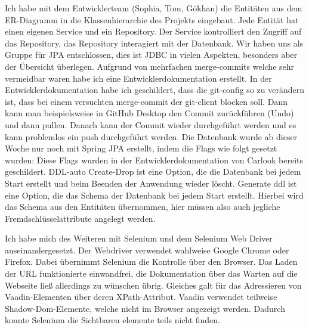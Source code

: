 Ich habe mit dem Entwicklerteam (Sophia, Tom, Gökhan) die Entitäten aus dem ER-Diagramm
in die Klassenhierarchie des Projekts eingebaut.
Jede Entität hat einen eigenen Service und ein Repository.
Der Service kontrolliert den Zugriff auf das Repository, das Repository interagiert mit der Datenbank.
Wir haben uns als Gruppe für JPA entschlossen, dies ist JDBC in vielen Aspekten,
besonders aber der Übersicht überlegen.
Aufgrund von mehrfachen merge-commits welche sehr vermeidbar waren habe ich eine Entwicklerdokumentation erstellt.
In der Entwicklerdokumentation habe ich geschildert, dass die git-config so zu verändern ist,
dass bei einem versuchten merge-commit der git-client blocken soll.
Dann kann man beispielsweise in GitHub Desktop den Commit zurückführen (Undo) und dann pullen.
Danach kann der Commit wieder durchgeführt werden und es kann problemlos ein push durchgeführt werden.
Die Datenbank wurde ab dieser Woche nur noch mit Spring JPA erstellt, indem die Flags wie folgt gesetzt
wurden:\newline
{}\newline
Diese Flags wurden in der Entwicklerdokumentation von Carlook bereits geschildert.
DDL-auto Create-Drop ist eine Option, die die Datenbank bei jedem Start erstellt und beim Beenden
der Anwendung wieder löscht.
Generate ddl ist eine Option, die das Schema der Datenbank bei jedem Start erstellt.
Hierbei wird das Schema aus den Entitäten übernommen, hier müssen also auch
jegliche Fremdschlüsselattribute angelegt werden.

Ich habe mich des Weiteren mit Selenium und dem Selenium Web Driver auseinandergesetzt.
Der Webdriver verwendet wahlweise Google Chrome oder Firefox.
Dabei übernimmt Selenium die Kontrolle über den Browser.
Das Laden der URL funktionierte einwandfrei, die Dokumentation über das Warten auf die Webseite
ließ allerdings zu wünschen übrig.
Gleiches galt für das Adressieren von Vaadin-Elementen über deren XPath-Attribut.
Vaadin verwendet teilweise Shadow-Dom-Elemente, welche nicht im Browser angezeigt werden.
Dadurch konnte Selenium die Sichtbaren elemente teils nicht finden.